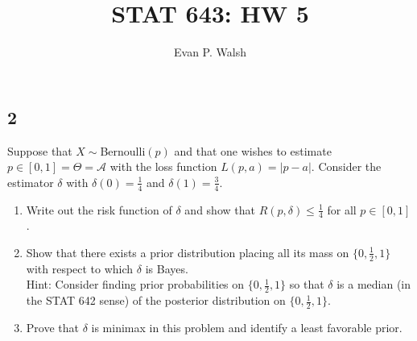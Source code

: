 \documentclass[12pt]{article}
\title{STAT 643: HW 5}
\author{Evan P. Walsh}
\begin{document}
\maketitle


\newpage
\subsection*{2}
\begin{tcolorbox}
  Suppose that $X\sim$Bernoulli$(p)$ and that one wishes to estimate $p\in[0,1]=\Theta=\mathcal{A}$ with the loss function $L(p,a)=|p-a|$.  
  Consider the estimator $\delta$ with $\delta(0)=\frac{1}{4}$ and $\delta(1)=\frac{3}{4}$.
  \begin{enumerate}[label=(\alph*)]
    \item Write out the risk function of $\delta$ and show that $R(p,\delta)\leq \frac{1}{4}$ for all $p\in[0,1]$.
    \item Show that there exists a prior distribution placing all its mass on $\{0,\frac{1}{2},1\}$ with respect to which $\delta$ is Bayes.\\
      Hint: Consider finding   prior probabilities on $\{0,\frac{1}{2},1\}$ so that $\delta$ is a median (in the STAT 642 sense) of the posterior distribution on $\{0,\frac{1}{2},1\}$.
    \item Prove that $\delta$ is minimax in this problem and identify a least favorable prior.
  \end{enumerate}
\end{tcolorbox}
\end{document}
